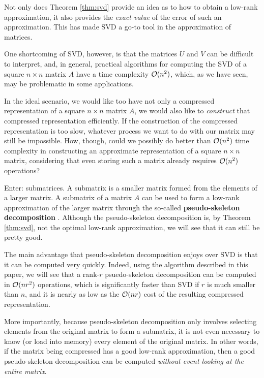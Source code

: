 \documentclass{article}
\begin{document}
	Not only does Theorem \ref{thm:svd} provide an idea as to how to obtain a low-rank approximation, it also provides the \textit{exact value} of the error of such an approximation. This has made SVD a go-to tool in the approximation of matrices.
	
	One shortcoming of SVD, however, is that the matrices $U$ and $V$ can be difficult to interpret, and, in general, practical algorithms for computing the SVD of a square $n\times n$ matrix $A$ have a time complexity $\mathcal{O}(n^2)$, which, as we have seen, may be problematic in some applications.
	
	
	In the ideal scenario, we would like too have not only a compressed representation of a square $n\times n$ matrix $A$, we would also like to \textit{construct} that compressed representation efficiently. If the construction of the compressed representation is too slow, whatever process we want to do with our matrix may still be impossible. How, though, could we possibly do better than $\mathcal{O}(n^2)$ time complexity in constructing an approximate representation of a square $n\times n$ matrix, considering that even storing such a matrix already requires $\mathcal{O}(n^2)$ operations?
	
	Enter: submatrices. A submatrix is a smaller matrix formed from the elements of a larger matrix. A submatrix of a matrix $A$ can be used to form a low-rank approximation of the larger matrix through the so-called \textbf{pseudo-skeleton decomposition} \cite{goreinov_1997}. Although the pseudo-skeleton decomposition is, by Theorem \ref{thm:svd}, not the optimal low-rank approximation, we will see that it can still be pretty good.
	
	The main advantage that pseudo-skeleton decomposition enjoys over SVD is that it can be computed very quickly. Indeed, using the algorithm described in this paper, we will see that a rank-$r$ psuedo-skeleton decomposition can be computed in $\mathcal{O}(nr^2)$ operations, which is significantly faster than SVD if $r$ is much smaller than $n$, and it is nearly as low as the $\mathcal{O}(nr)$ cost of the resulting compressed representation.
	
	More importantly, because pseudo-skeleton decomposition only involves selecting elements from the original matrix to form a submatrix, it is not even necessary to know (or load into memory) every element of the original matrix. In other words, if the matrix being compressed has a good low-rank approximation, then a good pseudo-skeleton decomposition can be computed \textit{without event looking at the entire matrix}.
	
\end{document}
